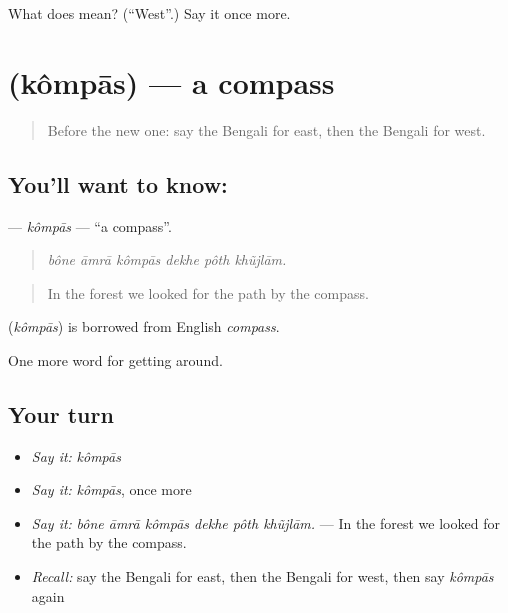 \begin{tcolorbox}[breakable,colback=teal!4,colframe=teal!35!black,title={Before you move on}]
What does  mean? (\textquotedblleft{}West\textquotedblright{}.) Say it once more.
\end{tcolorbox}
\section[\texorpdfstring{\bn{কম্পাস} (kômpās)}{কম্পাস (kômpās)}]{ (kômpās) — a compass}

\label{lesson:BN-C401-kompas}



\begin{quote}
Before the new one: say the Bengali for east, then the Bengali for west.
\end{quote}

\subsection*{You'll want to know: }
\textbf{} — \emph{kômpās} — \textquotedblleft{}a compass\textquotedblright{}.

\begin{quote}
     
\end{quote}

\begin{quote}
\emph{bône āmrā kômpās dekhe pôth khũjlām.}
\end{quote}

\begin{quote}
In the forest we looked for the path by the compass.
\end{quote}

\begin{cousinweb}
\textbf{} (\emph{kômpās}) is borrowed from English \emph{compass}.
\end{cousinweb}

\begin{grammarlens}[title={What you've built}]
One more word for getting around.
\end{grammarlens}

\subsection*{Your turn}
\begin{itemize}
\raggedright
  \item \emph{Say it:} \emph{kômpās}
  \item \emph{Say it:} \emph{kômpās}, once more
  \item \emph{Say it:} \emph{bône āmrā kômpās dekhe pôth khũjlām.} — In the forest we looked for the path by the compass.
  \item \emph{Recall:} say the Bengali for east, then the Bengali for west, then say \emph{kômpās} again
\end{itemize}

